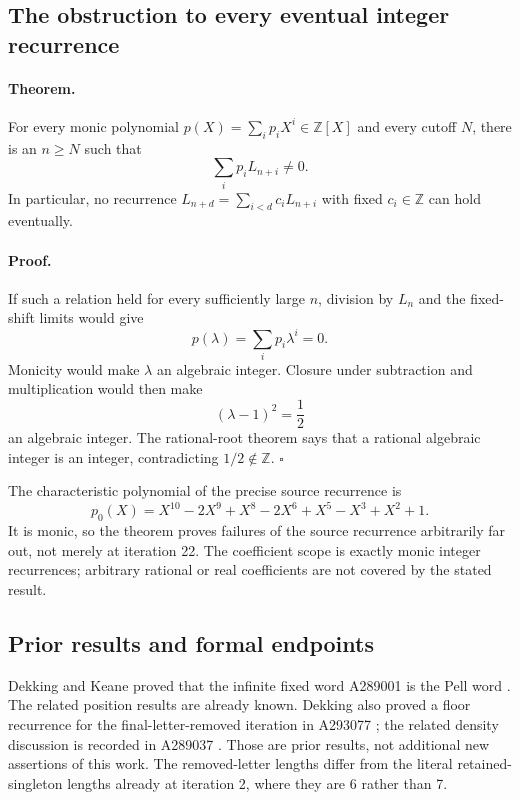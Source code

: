 \documentclass[11pt]{article}
\begin{document}
\subsection{The obstruction to every eventual integer recurrence}

\paragraph{Theorem.}
For every monic polynomial $p(X)=\sum_i p_iX^i\in\mathbb Z[X]$
and every cutoff $N$, there is an $n\ge N$ such that
\[
 \sum_i p_iL_{n+i}\ne0.
\]
In particular, no recurrence
$L_{n+d}=\sum_{i<d}c_iL_{n+i}$ with fixed $c_i\in\mathbb Z$
can hold eventually.

\paragraph{Proof.}
If such a relation held for every sufficiently large $n$, division by
$L_n$ and the fixed-shift limits would give
\[
 p(\lambda)=\sum_i p_i\lambda^i=0.
\]
Monicity would make $\lambda$ an algebraic integer. Closure under
subtraction and multiplication would then make
\[
 (\lambda-1)^2=\frac12
\]
an algebraic integer. The rational-root theorem says that a rational
algebraic integer is an integer, contradicting $1/2\notin\mathbb Z$.
\hfill$\square$

The characteristic polynomial of the precise source recurrence is
\[
 p_0(X)=X^{10}-2X^9+X^8-2X^6+X^5-X^3+X^2+1.
\]
It is monic, so the theorem proves failures of the source recurrence
arbitrarily far out, not merely at iteration 22. The coefficient scope
is exactly monic integer recurrences; arbitrary rational or real
coefficients are not covered by the stated result.

\subsection{Prior results and formal endpoints}

Dekking and Keane proved that the infinite fixed word A289001 is the
Pell word \cite[Theorem~4]{DekkingKeane}. The related position results
are already known. Dekking also proved a floor recurrence for the
final-letter-removed iteration in A293077 \cite{A293077}; the related
density discussion is recorded in A289037 \cite{A289037}.
Those are prior results, not additional new assertions of this work.
The removed-letter lengths differ from the literal retained-singleton
lengths already at iteration 2, where they are 6 rather than 7.
\end{document}
